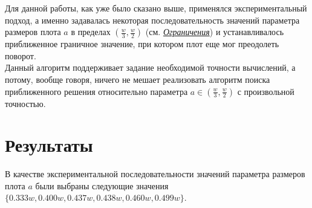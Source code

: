 \documentclass[12pt,a4paper]{article}
\begin{document}
		Для данной работы, как уже было сказано выше, применялся экспериментальный подход, а именно задавалась некоторая последовательность значений параметра размеров плота $a$ в пределах $(\frac{w}{3}, \frac{w}{2})$ (см. \hyperref[subsec:limitations]{\textit{Ограничения}}) и устанавливалось приближенное граничное значение, при котором плот еще мог преодолеть поворот.\\
		
		Данный алгоритм поддерживает задание необходимой точности вычислений, а потому, вообще говоря, ничего не мешает реализовать алгоритм поиска приближенного решения относительно параметра $a\in(\frac{w}{3}, \frac{w}{2})$ с произвольной точностью.
	
	\section{Результаты}
		В качестве экспериментальной последовательности значений параметра размеров плота $a$ были выбраны следующие значения $\{0.333w, 0.400w, 0.437w, 0.438w, 0.460w, 0.499w\}$.\\
		
\end{document}
